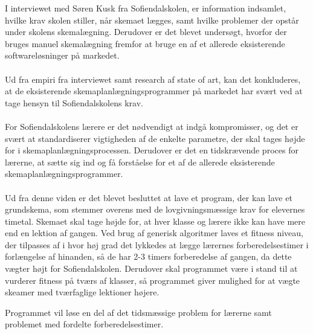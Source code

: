 I interviewet med Søren Kusk fra Sofiendalskolen, er information indsamlet, hvilke krav skolen stiller, når skemaet lægges, samt hvilke problemer der opstår under skolens skemalægning. Derudover er det blevet undersøgt, hvorfor der bruges manuel skemalægning fremfor at bruge en af et allerede eksisterende softwareløsninger på markedet.
\\\\
Ud fra empiri fra interviewet samt research af state of art, kan det konkluderes, at de eksisterende skemaplanlægningsprogrammer på markedet har svært ved at tage hensyn til Sofiendalskolens krav.
\\\\
For Sofiendalskolens lærere er det nødvendigt at indgå kompromisser, og det er svært at standardiserer vigtigheden af de enkelte parametre, der skal tages højde for i skemaplanlægningsprocessen. Derudover er det en tidskrævende proces for lærerne, at sætte sig ind og få forståelse for et af de allerede eksisterende skemaplanlægningsprogrammer.
\\\\
Ud fra denne viden er det blevet besluttet at lave et program, der kan lave et grundskema, som stemmer overens med de lovgivningsmæssige krav for elevernes timetal. Skemaet skal tage højde for, at hver klasse og lærere ikke kan have mere end en lektion af gangen. Ved brug af generisk algoritmer laves et fitness niveau, der tilpasses af i hvor høj grad det lykkedes at lægge lærernes forberedelsestimer i forlængelse af hinanden, så de har 2-3 timers forberedelse af gangen, da dette vægter højt for Sofiendalskolen. Derudover skal programmet være i stand til at vurderer fitness på tværs af klasser, så programmet giver mulighed for at vægte skeamer med tværfaglige lektioner højere.

Programmet vil løse en del af det tidsmæssige problem for lærerne samt problemet med fordelte forberedelsestimer.